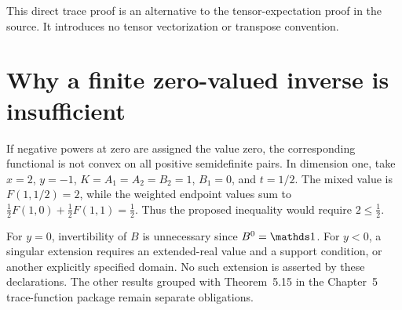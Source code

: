 \documentclass{article}
\begin{document}
This direct trace proof is an alternative to the tensor-expectation proof in
the source. It introduces no tensor vectorization or transpose convention.

\section{Why a finite zero-valued inverse is insufficient}

If negative powers at zero are assigned the value zero, the corresponding
functional is not convex on all positive semidefinite pairs. In dimension one,
take $x=2$, $y=-1$, $K=A_1=A_2=B_2=1$, $B_1=0$, and $t=1/2$.
The mixed value is $F(1,1/2)=2$, while the weighted endpoint values sum to
$\tfrac12F(1,0)+\tfrac12F(1,1)=\tfrac12$. Thus the proposed inequality
would require $2\leq\tfrac12$.

For $y=0$, invertibility of $B$ is unnecessary since $B^0=\Id$.
For $y<0$, a singular extension requires an extended-real value and a support
condition, or another explicitly specified domain. No such extension is
asserted by these declarations. The other results grouped with Theorem~5.15
in the Chapter~5 trace-function package remain separate obligations.



\end{document}

